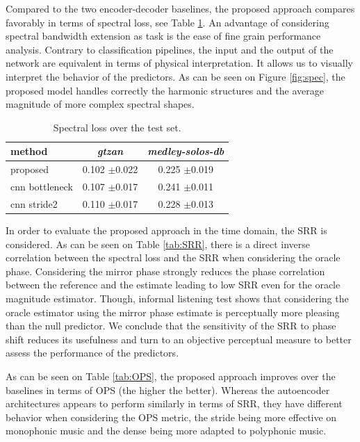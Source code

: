 \documentclass{article}
\begin{document}
Compared to the two encoder-decoder baselines, the proposed approach compares favorably in terms of spectral loss, see Table \ref{tab:loss}. An advantage of considering spectral bandwidth extension as task is the ease of fine grain performance analysis. Contrary to classification pipelines, the input and the output of the network are equivalent in terms of physical interpretation. It allows us to visually interpret the behavior of the predictors. As can be seen on Figure \ref{fig:spec}, the proposed model handles correctly the harmonic structures and the average magnitude of more complex spectral shapes.

\begin{table}[t]
  \caption{Spectral loss over the test set.}
  \label{tab:loss}
  \begin{center}
\begin{tabular}{lcc}
method & \textit{gtzan} & \textit{medley-solos-db} \\
\hline
proposed & 0.102 $\pm$0.022 & 0.225 $\pm$0.019 \\
cnn bottleneck & 0.107 $\pm$0.017 & 0.241 $\pm$0.011 \\
cnn stride2 & 0.110 $\pm$0.017 & 0.228 $\pm$0.013 \\
\end{tabular}
\end{center}
\vspace{-4mm}
\end{table}

In order to evaluate the proposed approach in the time domain, the SRR is considered. As can be seen on Table \ref{tab:SRR}, there is a direct inverse correlation between the spectral loss and the SRR when considering the oracle phase. Considering the mirror phase strongly reduces the phase correlation between the reference and the estimate leading to low SRR even for the oracle magnitude estimator. Though, informal listening test shows that considering the oracle estimator using the mirror phase estimate is perceptually more pleasing than the null predictor. We conclude that the sensitivity of the SRR to phase shift reduces its usefulness and turn to an objective perceptual measure to better assess the performance of the predictors.

As can be seen on Table \ref{tab:OPS}, the proposed approach improves over the baselines in terms of OPS (the higher the better). Whereas the autoencoder architectures appears to perform similarly in terms of SRR, they have different behavior when considering the OPS metric, the stride being more effective on monophonic music and the dense being more adapted to polyphonic music.
\end{document}
